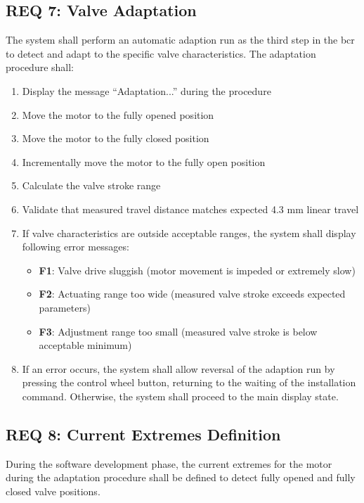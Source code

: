 \subsection*{REQ 7: Valve Adaptation} %
\label{subsec:REQ 7: Valve Adaptation}
The system shall perform an automatic adaption run as the third step in the \acs{bcr} to detect and adapt to the specific valve characteristics. The adaptation procedure shall:
\begin{enumerate}
    \item Display the message ``Adaptation...'' during the procedure
    \item Move the motor to the fully opened position
    \item Move the motor to the fully closed position
    \item Incrementally move the motor to the fully open position
    \item Calculate the valve stroke range
    \item Validate that measured travel distance matches expected 4.3 mm linear travel
    \item If valve characteristics are outside acceptable ranges, the system shall display following error messages:
    \begin{itemize}
        \item \textbf{F1}: Valve drive sluggish (motor movement is impeded or extremely slow)
        \item \textbf{F2}: Actuating range too wide (measured valve stroke exceeds expected parameters)
        \item \textbf{F3}: Adjustment range too small (measured valve stroke is below acceptable minimum)
    \end{itemize}
    \item If an error occurs, the system shall allow reversal of the adaption run by pressing the control wheel button, returning to the waiting of the installation command. Otherwise, the system shall proceed to the main display state.
\end{enumerate}

\subsection*{REQ 8: Current Extremes Definition}
\label{subsec:REQ 8: Current Extremes Definition}
During the software development phase, the current extremes for the motor during the adaptation procedure shall be defined to detect fully opened and fully closed valve positions.

